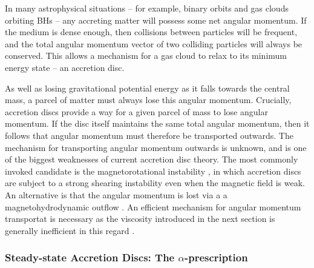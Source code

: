 In many astrophysical situations -- for example, 
binary orbits and gas clouds orbiting BHs --
any accreting matter will possess some net angular momentum.
If the medium is dense enough, then collisions between particles will be
frequent, and the total angular momentum vector of two colliding particles
will always be conserved. This allows a mechanism for a gas cloud to relax to 
its minimum energy state -- an accretion disc. 

As well as losing gravitational potential energy as it falls towards 
the central mass, a parcel of matter must always lose this angular momentum. 
Crucially, accretion discs provide a way for a given parcel of mass
to lose angular momentum. If the disc itself maintains the same total 
angular momentum, then it follows that angular momentum must 
therefore be transported outwards. The mechanism for transporting 
angular momentum outwards is unknown, and is one of the biggest 
weaknesses of current accretion disc theory. The most commonly invoked
candidate is the magnetorotational instability \citep[MRI; ][]{balbus1991},
in which accretion discs are subject to a strong shearing instability even
when the magnetic field is weak. An alternative is that the angular momentum is lost
via a a magnetohydrodynamic outflow \citep{blandfordpayne}. An efficient mechanism
for angular momentum transportat is necessary as the viscosity introduced in the next section is
generally inefficient in this regard \citep{pringle1991}.





\subsubsection{Steady-state Accretion Discs: The $\alpha$-prescription}

\label{sec:alpha_disc}

